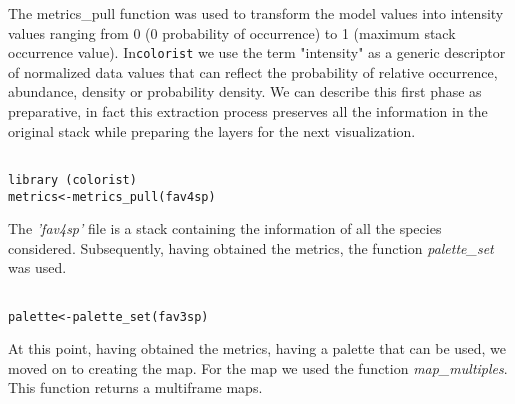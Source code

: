\documentclass[12pt,a4paper]{article}
\begin{document}
The metrics\_pull function was used to transform the model values into intensity values ranging from 0 (0 probability of occurrence) to 1 (maximum stack occurrence value).
  In\texttt{colorist} we use the term "intensity" as a generic descriptor of normalized data values that can reflect the probability of relative occurrence, abundance, density or probability density.\citep{colo}
We can describe this first phase as preparative, in fact this extraction process preserves all the information in the original stack while preparing the layers for the next visualization.

\begin{lstlisting}

library (colorist)
metrics<-metrics_pull(fav4sp) 

\end{lstlisting}

\bigskip
The \textit{'fav4sp'} file is a stack containing the information of all the species considered.
Subsequently, having obtained the metrics, the function \textit{palette\_set} was used.

\begin{lstlisting}

palette<-palette_set(fav3sp)
\end{lstlisting}

\bigskip
At this point, having obtained the metrics, having a palette that can be used, we moved on to creating the map.
For the map we used the function \textit{map\_multiples}.
This function returns a multiframe maps.
\end{document}
